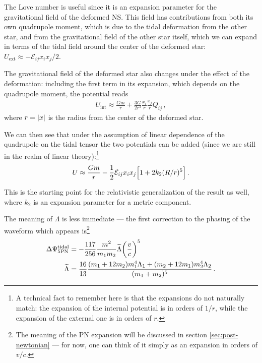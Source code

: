 \documentclass[main.tex]{subfiles}
\begin{document}
The Love number is useful since it is an expansion parameter for the gravitational field of the deformed \ac{NS}. This field has contributions from both its own quadrupole moment, which is due to the tidal deformation from the other star, and from the gravitational field of the other star itself, which we can expand in terms of the tidal field around the center of the deformed star: \(U _{\text{ext}} \approx - \mathcal{E}_{ij} x_{i} x_{j} / 2\). 

The gravitational field of the deformed star also changes under the effect of the deformation: including the first term in its expansion, which depends on the quadrupole moment, the potential reads  
%
\begin{align}
U _{\text{int}} \approx \frac{Gm}{r} + \frac{3G}{2r^3} \frac{x_i}{r} \frac{x_j}{r} Q_{ij}
\,,
\end{align}
%
where \(r = \abs{x}\) is the radius from the center of the deformed star.

We can then see that under the assumption of linear dependence of the quadrupole on the tidal tensor the two potentials can be added (since we are still in the realm of linear theory):\footnote{A technical fact to remember here is that the expansions do not naturally match: the expansion of the internal potential is in orders of \(1/r\), while the expansion of the external one is in orders of \(r\). } 
%
\begin{align}
U \approx \frac{Gm}{r} - \frac{1}{2} \mathcal{E}_{ij} x_i x_j \qty[1 + 2 k_2 (R / r)^{5}]
\,.
\end{align}

This is the starting point for the relativistic generalization of the result as well, where \(k_2 \) is an expansion parameter for a metric component. 

The meaning of \(\Lambda \) is less immediate ---  the first correction to the phasing of the waveform which appears is\footnote{The meaning of the \ac{PN} expansion will be discussed in section \ref{sec:post-newtonian} --- for now, one can think of it simply as an expansion in orders of \(v/c\).} \cites[eq.\ 14.231]{maggioreGravitationalWavesVolume2018}{flanaganConstrainingNeutronStar2008}
%
\begin{align}
\Delta \Psi^{\text{tidal}}_{\text{5PN}} &= - \frac{117}{256} \frac{m^2}{m_1 m_2 } \widetilde{\Lambda } \qty(\frac{v}{c})^{5} 
\\
\widetilde{\Lambda} &= \frac{16}{13} \frac{(m_1 + 12m_2 ) m_1^{4} \Lambda_1 + (m_2 + 12 m_1 ) m_2^{4} \Lambda_2 }{(m_1 +m_2 )^{5}}
\,.
\end{align}
\end{document}
